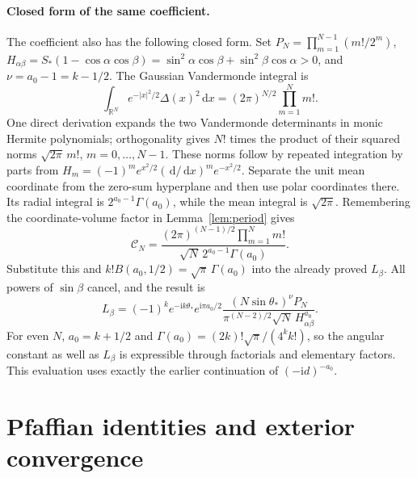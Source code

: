 \documentclass[11pt]{article}
\numberwithin{equation}{section}
\theoremstyle{definition}
\newcommand{\dd}{\,\mathrm d}
\newcommand{\ii}{\mathrm i}
\newcommand{\R}{\mathbb R}
\begin{document}
\paragraph{Closed form of the same coefficient.}
The coefficient also has the following closed form.
Set \(P_N=\prod_{m=1}^{N-1}(m!/2^m)\),
\(H_{\alpha\beta}=S_*(1-\cos\alpha\cos\beta)
=\sin^2\alpha\cos\beta+\sin^2\beta\cos\alpha>0\), and
\(\nu=a_0-1=k-1/2\). The Gaussian Vandermonde integral is
\[
 \int_{\R^N}e^{-|x|^2/2}\Delta(x)^2\dd x
 =(2\pi)^{N/2}\prod_{m=1}^N m!.
\]
One direct derivation expands the two Vandermonde determinants in
monic Hermite polynomials; orthogonality gives \(N!\) times the
product of their squared norms \(\sqrt{2\pi}\,m!\),
\(m=0,\ldots,N-1\). These norms follow by repeated integration by
parts from \(H_m=(-1)^me^{x^2/2}(\dd/\dd x)^me^{-x^2/2}\).
Separate the unit mean coordinate from the zero-sum hyperplane and
then use polar coordinates there. Its radial integral is
\(2^{a_0-1}\Gamma(a_0)\), while the mean integral is
\(\sqrt{2\pi}\). Remembering the coordinate-volume factor in
Lemma~\ref{lem:period} gives
\[
 \mathscr C_N=
 \frac{(2\pi)^{(N-1)/2}\prod_{m=1}^Nm!}
      {\sqrt N\,2^{a_0-1}\Gamma(a_0)}.
\]
Substitute this and
\(k!B(a_0,1/2)=\sqrt\pi\,\Gamma(a_0)\) into the already proved
\(L_\beta\). All powers of \(\sin\beta\) cancel, and the result is
\begin{equation}
 L_\beta=(-1)^k e^{-\ii k\theta_*}e^{\ii\pi a_0/2}
 \frac{(N\sin\theta_*)^{\nu}P_N}
 {\pi^{(N-2)/2}\sqrt N\,H_{\alpha\beta}^{a_0}}.
 \label{eq:amplitudeclosed}
\end{equation}
For even \(N\), \(a_0=k+1/2\) and
\(\Gamma(a_0)=(2k)!\sqrt\pi/(4^kk!)\), so the angular constant
as well as \(L_\beta\) is expressible through factorials and
elementary factors. This evaluation uses exactly the earlier
continuation of \((-\ii d)^{-a_0}\).



\section{Pfaffian identities and exterior convergence}\label{app:pfaffian}
\end{document}
